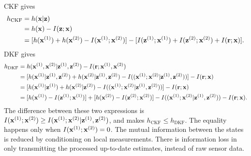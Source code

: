 CKF gives
\begin{equation}
\label{eq:p1}
\begin{split}
h_{\text{CKF}}&=h({\bf x}|{\bf z}) \\
&=h({\bf x})-I({\bf z};{\bf x}) \\
&=[h({\bf x}^{(1)})+h({\bf x}^{(2)})-I({\bf x}^{(1)};{\bf x}^{(2)})]-[I({\bf z}^{(1)};{\bf x}^{(1)})+I({\bf z}^{(2)};{\bf x}^{(2)})+I({\bf r};{\bf x})].
\end{split}
\end{equation}
DKF gives
\begin{equation}
\label{eq:p2}
\begin{split}
h_{\text{DKF}}&=h({\bf x}^{(1)},{\bf x}^{(2)}|{\bf z}^{(1)},{\bf z}^{(2)})-I({\bf r};{\bf x}^{(1)},{\bf x}^{(2)}) \\
&=[h({\bf x}^{(1)}|{\bf z}^{(1)},{\bf z}^{(2)})+h({\bf x}^{(2)}|{\bf z}^{(1)},{\bf z}^{(2)})-I(({\bf x}^{(1)};{\bf x}^{(2)}|{\bf z}^{(1)},{\bf z}^{(2)}))]-I({\bf r};{\bf x}) \\
&=[h({\bf x}^{(1)}|{\bf z}^{(1)})+h({\bf x}^{(2)}|{\bf z}^{(2)})-I(({\bf x}^{(1)};{\bf x}^{(2)}|{\bf z}^{(1)},{\bf z}^{(2)}))]-I({\bf r};{\bf x}) \\
&=[h({\bf x}^{(1)})-I({\bf z}^{(1)};{\bf x}^{(1)})]+[h({\bf x}^{(2)})-I({\bf z}^{(2)};{\bf x}^{(2)})]-I(({\bf x}^{(1)};{\bf x}^{(2)}|{\bf z}^{(1)},{\bf z}^{(2)}))-I({\bf r};{\bf x}). \\
\end{split}
\end{equation}
The difference between these two expressions is $I({\bf x}^{(1)};{\bf x}^{(2)})\geq I({\bf x}^{(1)};{\bf x}^{(2)}|{\bf z}^{(1)},{\bf z}^{(2)})$, and makes $h_\text{CKF}\leq h_\text{DKF}$. The equality happens only when $I({\bf x}^{(1)};{\bf x}^{(2)})=0$. The mutual information between the states is reduced by conditioning on local measurements. There is information loss in only transmitting the processed up-to-date estimates, instead of raw sensor data.%

